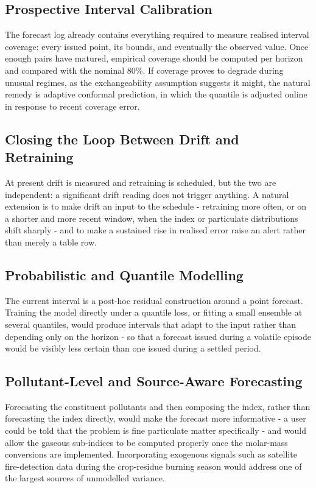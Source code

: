\subsection{Prospective Interval Calibration}
The forecast log already contains everything required to measure realised interval
coverage: every issued point, its bounds, and eventually the observed value. Once
enough pairs have matured, empirical coverage should be computed per horizon and
compared with the nominal 80\%. If coverage proves to degrade during unusual
regimes, as the exchangeability assumption suggests it might, the natural remedy
is adaptive conformal prediction, in which the quantile is adjusted online in
response to recent coverage error.

\subsection{Closing the Loop Between Drift and Retraining}
At present drift is measured and retraining is scheduled, but the two are
independent: a significant drift reading does not trigger anything. A natural
extension is to make drift an input to the schedule - retraining more often, or on
a shorter and more recent window, when the index or particulate distributions shift
sharply - and to make a sustained rise in realised error raise an alert rather than
merely a table row.

\subsection{Probabilistic and Quantile Modelling}
The current interval is a post-hoc residual construction around a point forecast.
Training the model directly under a quantile loss, or fitting a small ensemble at
several quantiles, would produce intervals that adapt to the input rather than
depending only on the horizon - so that a forecast issued during a volatile
episode would be visibly less certain than one issued during a settled period.

\subsection{Pollutant-Level and Source-Aware Forecasting}
Forecasting the constituent pollutants and then composing the index, rather than
forecasting the index directly, would make the forecast more informative - a user
could be told that the problem is fine particulate matter specifically - and would
allow the gaseous sub-indices to be computed properly once the molar-mass
conversions are implemented. Incorporating exogenous signals such as satellite
fire-detection data during the crop-residue burning season would address one of
the largest sources of unmodelled variance.

